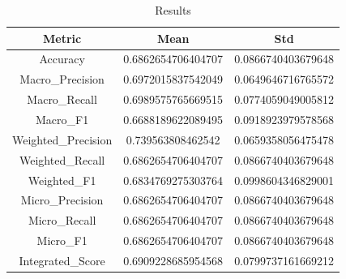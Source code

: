 \begin{table}[htbp]
\centering
\caption{Results}
\label{tab:csv}
\small
\setlength{\tabcolsep}{4pt}
\begin{tabular}{|c|c|c|}
\hline
Metric & Mean & Std \\
\hline
Accuracy & 0.6862654706404707 & 0.0866740403679648 \\
Macro_Precision & 0.6972015837542049 & 0.0649646716765572 \\
Macro_Recall & 0.6989575765669515 & 0.0774059049005812 \\
Macro_F1 & 0.6688189622089495 & 0.0918923979578568 \\
Weighted_Precision & 0.739563808462542 & 0.0659358056475478 \\
Weighted_Recall & 0.6862654706404707 & 0.0866740403679648 \\
Weighted_F1 & 0.6834769275303764 & 0.0998604346829001 \\
Micro_Precision & 0.6862654706404707 & 0.0866740403679648 \\
Micro_Recall & 0.6862654706404707 & 0.0866740403679648 \\
Micro_F1 & 0.6862654706404707 & 0.0866740403679648 \\
Integrated_Score & 0.6909228685954568 & 0.0799737161669212 \\
\hline
\end{tabular}
\end{table}